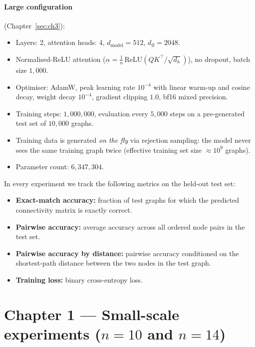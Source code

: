 \documentclass[11pt,a4paper]{article}
\begin{document}
\paragraph{Large configuration} (Chapter~\ref{sec:ch3}):
\begin{itemize}
    \item Layers: 2, attention heads: 4, $d_{\mathrm{model}} = 512$,
          $d_{\mathrm{ff}} = 2048$.
    \item Normalised-ReLU attention ($\alpha = \tfrac{1}{n}\,\mathrm{ReLU}(QK^\top/\sqrt{d_h})$),
          no dropout, batch size $1{,}000$.
    \item Optimiser: AdamW, peak learning rate $10^{-4}$ with linear
          warm-up and cosine decay, weight decay $10^{-4}$, gradient
          clipping $1.0$, bf16 mixed precision.
    \item Training steps: $1{,}000{,}000$, evaluation every $5{,}000$
          steps on a pre-generated test set of $10{,}000$ graphs.
    \item Training data is generated \emph{on the fly} via rejection
          sampling: the model never sees the same training graph twice
          (effective training set size $\approx 10^9$ graphs).
    \item Parameter count: $6{,}347{,}304$.
\end{itemize}

In every experiment we track the following metrics on the held-out test set:
\begin{itemize}
    \item \textbf{Exact-match accuracy:} fraction of test graphs for which
          the predicted connectivity matrix is exactly correct.
    \item \textbf{Pairwise accuracy:} average accuracy across all ordered
          node pairs in the test set.
    \item \textbf{Pairwise accuracy by distance:} pairwise accuracy
          conditioned on the shortest-path distance between the two nodes
          in the test graph.
    \item \textbf{Training loss:} binary cross-entropy loss.
\end{itemize}

\vspace{1em}

\section{Chapter 1 --- Small-scale experiments ($n = 10$ and $n = 14$)}
\label{sec:ch1}
\end{document}
